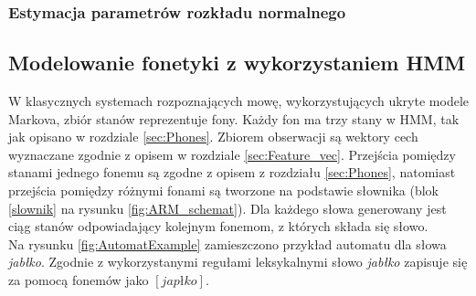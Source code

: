 \documentclass[11pt]{article}
\newcommand{\refBlock}[1]{%
	\hyperref[#1]{\ref*{#1}}%
}
\begin{document}
	   \subsubsection{Estymacja parametrów rozkładu normalnego}
	
    \subsection{Modelowanie fonetyki z wykorzystaniem HMM }
    W klasycznych systemach rozpoznających mowę, wykorzystujących ukryte modele Markova, zbiór stanów reprezentuje fony. Każdy fon ma trzy stany w HMM, tak jak opisano w rozdziale \ref{sec:Phones}. Zbiorem obserwacji są wektory cech wyznaczane zgodnie z opisem w rozdziale \ref{sec:Feature_vec}. Przejścia pomiędzy stanami jednego fonemu są zgodne z opisem z rozdziału \ref{sec:Phones}, natomiast przejścia pomiędzy różnymi fonami są tworzone na podstawie słownika (blok \refBlock{slownik} na rysunku \ref{fig:ARM_schemat}). Dla każdego słowa generowany jest ciąg stanów odpowiadający kolejnym fonemom, z których składa się słowo. \\
    Na rysunku \ref{fig:AutomatExample} zamieszczono przykład automatu dla słowa \textit{jabłko}. Zgodnie z wykorzystanymi regułami leksykalnymi słowo \textit{jabłko} zapisuje się za pomocą fonemów jako $[j a p ł k o]$. \\
    
\end{document}
